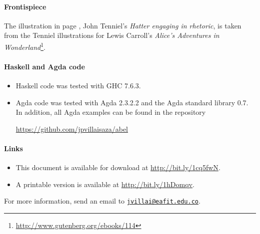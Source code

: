 \paragraph{Frontispiece}

The illustration in page \pageref{fig:hatter}, John Tenniel's
\emph{Hatter engaging in rhetoric}, is taken from the Tenniel
illustrations for Lewis Carroll's \emph{Alice's Adventures in
  Wonderland}\footnote{\url{http://www.gutenberg.org/ebooks/114}}.

\paragraph{Haskell and Agda code}

\begin{itemize}
\item
  Haskell code was tested with GHC 7.6.3.

\item
  Agda code was tested with Agda 2.3.2.2 and the Agda standard library
  0.7. In addition, all Agda examples can be found in the repository
  \begin{center}
    \url{https://github.com/jpvillaisaza/abel}
  \end{center}


\end{itemize}

\paragraph{Links}

\begin{itemize}
\item
  This document is available for download at
  \url{http://bit.ly/1cq5fwN}.

\item
  A printable version is available at \url{http://bit.ly/1hDomqv}.

\end{itemize}
For more information, send an email to
\href{mailto:jvillai@eafit.edu.co}{\nolinkurl{jvillai@eafit.edu.co}}.

\clearemptydoublepage
